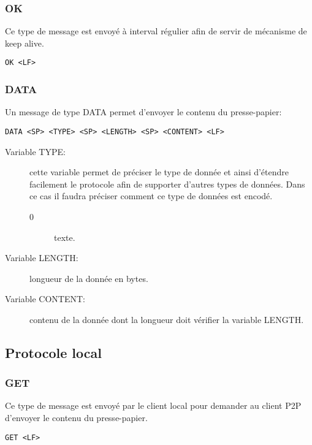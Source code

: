 \hrulefill

\subsubsection*{OK}
Ce type de message est envoyé à interval régulier afin de servir de mécanisme
de keep alive.
\begin{verbatim}
OK <LF>
\end{verbatim}

\hrulefill

\subsubsection*{DATA}
Un message de type DATA permet d'envoyer le contenu du presse-papier:
\begin{verbatim}
DATA <SP> <TYPE> <SP> <LENGTH> <SP> <CONTENT> <LF>
\end{verbatim}
\begin{description}
\item[Variable TYPE:] cette variable permet de préciser le type
  de donnée et ainsi d'étendre facilement le protocole afin de supporter
  d'autres types de données. Dans ce cas il faudra préciser comment ce type
  de données est encodé.
  \begin{description}
  \item[0] texte.
  \end{description}
\item[Variable LENGTH:] longueur de la donnée en bytes.
\item[Variable CONTENT:] contenu de la donnée dont la longueur
  doit vérifier la variable LENGTH.
\end{description}

\subsection{Protocole local}
\subsubsection*{GET}
Ce type de message est envoyé par le client local pour demander au client P2P
d'envoyer le contenu du presse-papier.
\begin{verbatim}
GET <LF>
\end{verbatim}

\hrulefill

